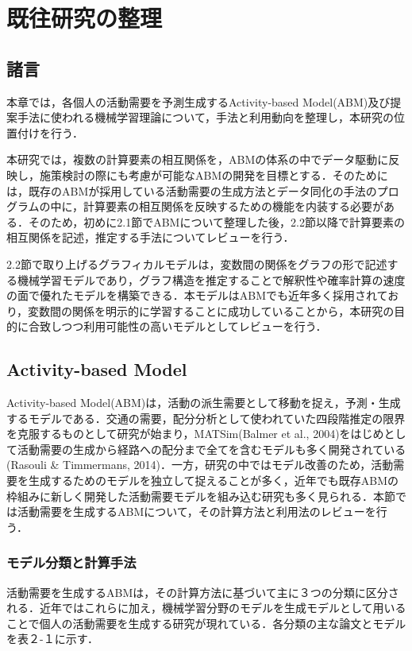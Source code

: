 \chapter{既往研究の整理}
\label{2}
\section{諸言}\label{2.1}

本章では，各個人の活動需要を予測生成するActivity-based Model(ABM)及び提案手法に使われる機械学習理論について，手法と利用動向を整理し，本研究の位置付けを行う．

本研究では，複数の計算要素の相互関係を，ABMの体系の中でデータ駆動に反映し，施策検討の際にも考慮が可能なABMの開発を目標とする．そのためには，既存のABMが採用している活動需要の生成方法とデータ同化の手法のプログラムの中に，計算要素の相互関係を反映するための機能を内装する必要がある．そのため，初めに2.1節でABMについて整理した後，2.2節以降で計算要素の相互関係を記述，推定する手法についてレビューを行う．

2.2節で取り上げるグラフィカルモデルは，変数間の関係をグラフの形で記述する機械学習モデルであり，グラフ構造を推定することで解釈性や確率計算の速度の面で優れたモデルを構築できる．本モデルはABMでも近年多く採用されており，変数間の関係を明示的に学習することに成功していることから，本研究の目的に合致しつつ利用可能性の高いモデルとしてレビューを行う．

\section{Activity-based Model}\label{2.2}

Activity-based Model(ABM)は，活動の派生需要として移動を捉え，予測・生成するモデルである．交通の需要，配分分析として使われていた四段階推定の限界を克服するものとして研究が始まり，MATSim(Balmer et al., 2004)をはじめとして活動需要の生成から経路への配分まで全てを含むモデルも多く開発されている(Rasouli \& Timmermans, 2014)．一方，研究の中ではモデル改善のため，活動需要を生成するためのモデルを独立して捉えることが多く，近年でも既存ABMの枠組みに新しく開発した活動需要モデルを組み込む研究も多く見られる．本節では活動需要を生成するABMについて，その計算方法と利用法のレビューを行う．

\subsection{モデル分類と計算手法}\label{2.2.1}

活動需要を生成するABMは，その計算方法に基づいて主に３つの分類に区分される．近年ではこれらに加え，機械学習分野のモデルを生成モデルとして用いることで個人の活動需要を生成する研究が現れている．各分類の主な論文とモデルを表２-１に示す．

